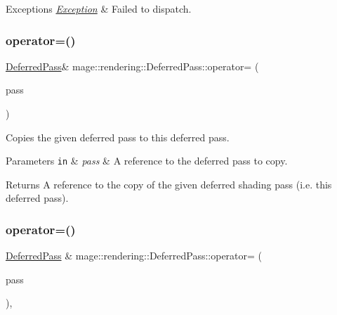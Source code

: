 \begin{DoxyExceptions}{Exceptions}
{\em \hyperlink{classmage_1_1_exception}{Exception}} & Failed to dispatch. \\
\hline
\end{DoxyExceptions}
\hypertarget{classmage_1_1rendering_1_1_deferred_pass_a5b9a7cf23089389be11d6a3c4526bde9}{}\label{classmage_1_1rendering_1_1_deferred_pass_a5b9a7cf23089389be11d6a3c4526bde9} 
\subsubsection{\texorpdfstring{operator=()}{operator=()}\hspace{0.1cm}{\footnotesize\ttfamily [1/2]}}
{\footnotesize\ttfamily \hyperlink{classmage_1_1rendering_1_1_deferred_pass}{Deferred\+Pass}\& mage\+::rendering\+::\+Deferred\+Pass\+::operator= (\begin{DoxyParamCaption}\item[{const \hyperlink{classmage_1_1rendering_1_1_deferred_pass}{Deferred\+Pass} \&}]{pass }\end{DoxyParamCaption})\hspace{0.3cm}{\ttfamily [delete]}}

Copies the given deferred pass to this deferred pass.


\begin{DoxyParams}[1]{Parameters}
\mbox{\tt in}  & {\em pass} & A reference to the deferred pass to copy. \\
\hline
\end{DoxyParams}
\begin{DoxyReturn}{Returns}
A reference to the copy of the given deferred shading pass (i.\+e. this deferred pass). 
\end{DoxyReturn}
\hypertarget{classmage_1_1rendering_1_1_deferred_pass_a5d701ca8725a2b9a2c95dfd89c0d7c0e}{}\label{classmage_1_1rendering_1_1_deferred_pass_a5d701ca8725a2b9a2c95dfd89c0d7c0e} 
\subsubsection{\texorpdfstring{operator=()}{operator=()}\hspace{0.1cm}{\footnotesize\ttfamily [2/2]}}
{\footnotesize\ttfamily \hyperlink{classmage_1_1rendering_1_1_deferred_pass}{Deferred\+Pass} \& mage\+::rendering\+::\+Deferred\+Pass\+::operator= (\begin{DoxyParamCaption}\item[{\hyperlink{classmage_1_1rendering_1_1_deferred_pass}{Deferred\+Pass} \&\&}]{pass }\end{DoxyParamCaption})\hspace{0.3cm}{\ttfamily [default]}, {\ttfamily [noexcept]}}

